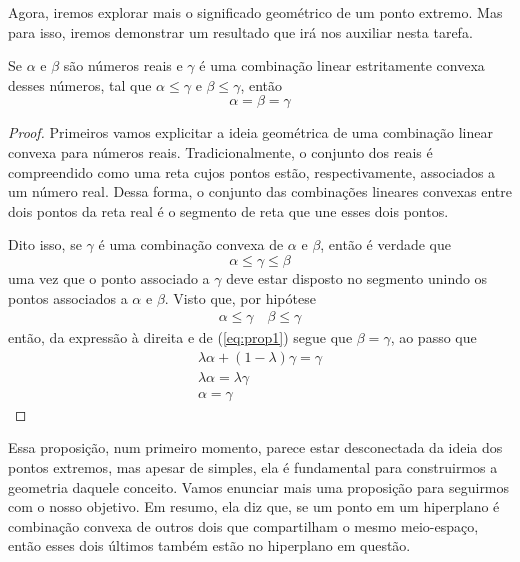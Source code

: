Agora, iremos explorar mais o significado geométrico de um ponto extremo.
Mas para isso, iremos demonstrar um resultado que irá nos auxiliar nesta tarefa.

\begin{prop:combinação convexa}
	\label{prop:combinação convexa}
	Se $\alpha$ e $\beta$ são números reais e $\gamma$ é uma combinação linear
	estritamente convexa desses números, tal que $\alpha \leq \gamma$ e
	$\beta \leq \gamma$, então \[\alpha = \beta = \gamma\]

	\begin{proof}
		Primeiros vamos explicitar a ideia geométrica de uma combinação linear
		convexa para números reais. Tradicionalmente, o conjunto dos reais é
		compreendido como uma reta cujos pontos estão, respectivamente, associados
		a um número real. Dessa forma, o conjunto das combinações lineares convexas
		entre dois pontos da reta real é o segmento de reta que une esses dois pontos.

		Dito isso, se $\gamma$ é uma combinação convexa de $\alpha$ e $\beta$, então é verdade que
		\begin{equation}
			\label{eq:prop1}
			\alpha \leq \gamma \leq \beta
		\end{equation}uma vez que o ponto associado a $\gamma$ deve estar
		disposto no segmento unindo os pontos associados a $\alpha$ e $\beta$.
		Visto que, por hipótese
		\begin{align*}
			\alpha \leq \gamma \quad \beta \leq \gamma
		\end{align*}
		então, da expressão à direita e de (\ref{eq:prop1})
		segue que $\beta = \gamma$, ao passo que
		\begin{gather*}
			\lambda \alpha + (1 - \lambda) \gamma = \gamma \\
			\lambda \alpha = \lambda \gamma \\
			\alpha = \gamma
		\end{gather*}
	\end{proof}
\end{prop:combinação convexa}

Essa proposição, num primeiro momento, parece estar desconectada da ideia dos
pontos extremos, mas apesar de simples, ela é fundamental para construirmos
a geometria daquele conceito. Vamos enunciar mais uma proposição para
seguirmos com o nosso objetivo. Em resumo, ela diz que, se um ponto em um
hiperplano é combinação convexa de outros dois que compartilham o mesmo
meio-espaço, então esses dois últimos também estão no hiperplano em questão.

